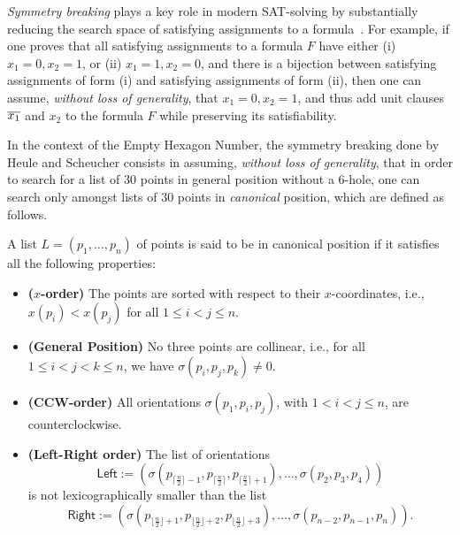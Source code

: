\emph{Symmetry breaking} plays a key role in modern SAT-solving by substantially reducing the search space of satisfying assignments to a formula~\cite{biereHandbookSatisfiabilityVolume2009}. For example, if one proves that all satisfying assignments to a formula $F$ have either (i) $x_1 = 0, x_2 = 1$, or  (ii) $x_1 = 1, x_2 = 0$, and there is a bijection between satisfying assignments of form (i) and satisfying assignments of form (ii), then one can assume, \emph{without loss of generality}, that $x_1 = 0, x_2 = 1$, and thus add unit clauses $\overline{x_1}$ and $x_2$ to the formula $F$ while preserving its satisfiability.

In the context of the Empty Hexagon Number, the symmetry breaking done by Heule and Scheucher consists in assuming, \emph{without loss of generality}, that in order to search for a list of $30$ points in general position without a $6$-hole, one can search only amongst lists of $30$ points in \emph{canonical} position, which are defined as follows.
\begin{definition}
A list $L = (p_1,\ldots, p_{n})$ of points is said to be in canonical position if it satisfies all the following properties:
\begin{itemize}
    \item \textbf{($x$-order)} The points are sorted with respect to their $x$-coordinates, i.e., $x(p_i) < x(p_j)$ for all $1 \leq i < j \leq n$.
    \item \textbf{(General Position)} No three points are collinear, i.e., for all $1 \leq i < j < k \leq n$, we have $\sigma(p_i, p_j, p_k) \neq 0$.
    \item \textbf{(CCW-order)} All orientations $\sigma(p_1, p_i, p_j)$, with $1 < i < j \leq n$, are counterclockwise.
    \item \textbf{(Left-Right order)} The list of orientations \[\textsf{Left} := \left(\sigma\left(p_{\lceil \frac{n}{2} \rceil -1}, p_{\lceil \frac{n}{2} \rceil},p_{\lceil \frac{n}{2} \rceil+1}\right), \ldots, \sigma\left(p_2, p_3, p_4\right) \right)\] is not lexicographically smaller than the list \[ \textsf{Right} := \left(\sigma\left(p_{\lfloor \frac{n}{2} \rfloor  + 1}, p_{\lfloor \frac{n}{2} \rfloor+2},p_{\lfloor \frac{n}{2} \rfloor+3}\right), \ldots, \sigma\left(p_{n-2}, p_{n-1}, p_{n}\right) \right).\] 
\end{itemize}
\end{definition}
